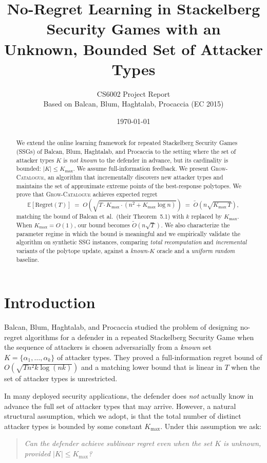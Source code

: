 \documentclass[11pt]{article}
\title{No-Regret Learning in Stackelberg Security Games with an\\
Unknown, Bounded Set of Attacker Types}
\author{CS6002 Project Report\\
Based on Balcan, Blum, Haghtalab, Procaccia (EC 2015)}
\date{\today}
\newcommand{\EE}{\mathbb{E}}
\newcommand{\Kmax}{K_{\max}}
\begin{document}
\maketitle

\begin{abstract}
We extend the online learning framework for repeated Stackelberg Security Games (SSGs) of Balcan, Blum, Haghtalab, and Procaccia \cite{balcan2015} to the setting where the set of attacker types $K$ is \emph{not known} to the defender in advance, but its cardinality is bounded: $|K| \le \Kmax$. We assume full-information feedback. We present \textsc{Grow-Catalogue}, an algorithm that incrementally discovers new attacker types and maintains the set of approximate extreme points of the best-response polytopes. We prove that \textsc{Grow-Catalogue} achieves expected regret
\[
\EE[\text{Regret}(T)] \;=\; O\!\left(\sqrt{T \cdot \Kmax \cdot (n^2 + \Kmax \log n)}\right)
\;=\; \tilde{O}\!\left(n\sqrt{\Kmax\, T}\right),
\]
matching the bound of Balcan et al.\ (their Theorem~5.1) with $k$ replaced by $\Kmax$. When $\Kmax = O(1)$, our bound becomes $\tilde O(n\sqrt{T})$. We also characterize the parameter regime in which the bound is meaningful and we empirically validate the algorithm on synthetic SSG instances, comparing \emph{total recomputation} and \emph{incremental} variants of the polytope update, against a \emph{known-$K$} oracle and a \emph{uniform random} baseline.
\end{abstract}

\section{Introduction}

Balcan, Blum, Haghtalab, and Procaccia \cite{balcan2015} studied the problem of designing no-regret algorithms for a defender in a repeated Stackelberg Security Game when the sequence of attackers is chosen adversarially from a \emph{known} set $K = \{\alpha_1, \dots, \alpha_k\}$ of attacker types. They proved a full-information regret bound of $O(\sqrt{T n^2 k \log(nk)})$ and a matching lower bound that is linear in $T$ when the set of attacker types is unrestricted.

In many deployed security applications, the defender does \emph{not} actually know in advance the full set of attacker types that may arrive. However, a natural structural assumption, which we adopt, is that the total number of distinct attacker types is bounded by some constant $\Kmax$. Under this assumption we ask:
\begin{quote}
\emph{Can the defender achieve sublinear regret even when the set $K$ is unknown, provided $|K| \le \Kmax$?}
\end{quote}
\end{document}
